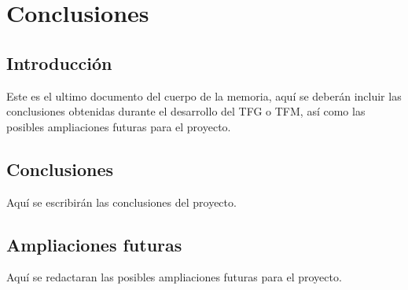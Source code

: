 
\chapter{Conclusiones}

\thispagestyle{plain}
\renewcommand{\tablename}{Tabla}

\section{Introducción}

Este es el ultimo documento del cuerpo de la memoria, aquí se deberán incluir las conclusiones obtenidas durante el desarrollo del TFG o TFM, así como las posibles ampliaciones futuras para el proyecto.

\section{Conclusiones}

Aquí se escribirán las conclusiones del proyecto.

\section{Ampliaciones futuras}

Aquí se redactaran las posibles ampliaciones futuras para el proyecto.

\blankpage